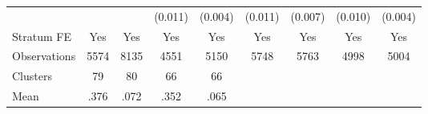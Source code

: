 {\begin{tabular}{l*{8}{c}}
                &                  &                  &  (0.011)         &  (0.004)         &  (0.011)         &  (0.007)         &  (0.010)         &  (0.004)         \\
Stratum FE      &      Yes         &      Yes         &      Yes         &      Yes         &      Yes         &      Yes         &      Yes         &      Yes         \\
\hline
Observations    &     5574         &     8135         &     4551         &     5150         &     5748         &     5763         &     4998         &     5004         \\
Clusters        &       79         &       80         &       66         &       66         &                  &                  &                  &                  \\
Mean            &     .376         &     .072         &     .352         &     .065         &                  &                  &                  &                  \\
\hline\hline
\end{tabular}
}
